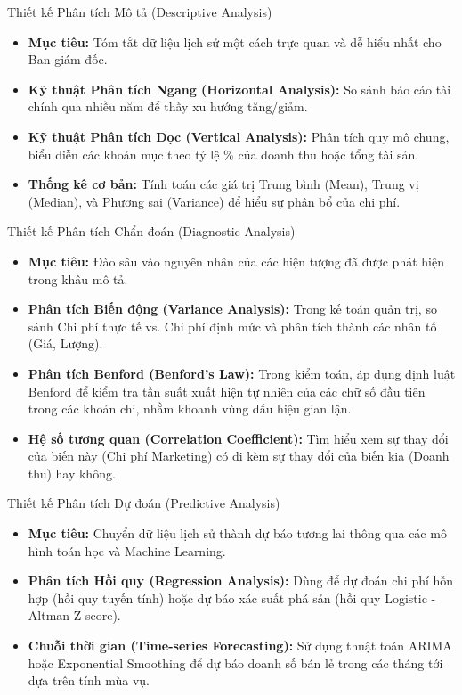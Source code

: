 \documentclass[aspectratio=169,12pt]{beamer}
\begin{document}
\begin{frame}{Thiết kế Phân tích Mô tả (Descriptive Analysis)}
\begin{itemize}
    \item \textbf{Mục tiêu:} Tóm tắt dữ liệu lịch sử một cách trực quan và dễ hiểu nhất cho Ban giám đốc.
    \item \textbf{Kỹ thuật Phân tích Ngang (Horizontal Analysis):} So sánh báo cáo tài chính qua nhiều năm để thấy xu hướng tăng/giảm.
    \item \textbf{Kỹ thuật Phân tích Dọc (Vertical Analysis):} Phân tích quy mô chung, biểu diễn các khoản mục theo tỷ lệ \% của doanh thu hoặc tổng tài sản.
    \item \textbf{Thống kê cơ bản:} Tính toán các giá trị Trung bình (Mean), Trung vị (Median), và Phương sai (Variance) để hiểu sự phân bổ của chi phí.
\end{itemize}
\end{frame}

\begin{frame}{Thiết kế Phân tích Chẩn đoán (Diagnostic Analysis)}
\begin{itemize}
    \item \textbf{Mục tiêu:} Đào sâu vào nguyên nhân của các hiện tượng đã được phát hiện trong khâu mô tả.
    \item \textbf{Phân tích Biến động (Variance Analysis):} Trong kế toán quản trị, so sánh Chi phí thực tế vs. Chi phí định mức và phân tích thành các nhân tố (Giá, Lượng).
    \item \textbf{Phân tích Benford (Benford's Law):} Trong kiểm toán, áp dụng định luật Benford để kiểm tra tần suất xuất hiện tự nhiên của các chữ số đầu tiên trong các khoản chi, nhằm khoanh vùng dấu hiệu gian lận.
    \item \textbf{Hệ số tương quan (Correlation Coefficient):} Tìm hiểu xem sự thay đổi của biến này (Chi phí Marketing) có đi kèm sự thay đổi của biến kia (Doanh thu) hay không.
\end{itemize}
\end{frame}

\begin{frame}{Thiết kế Phân tích Dự đoán (Predictive Analysis)}
\begin{itemize}
    \item \textbf{Mục tiêu:} Chuyển dữ liệu lịch sử thành dự báo tương lai thông qua các mô hình toán học và Machine Learning.
    \item \textbf{Phân tích Hồi quy (Regression Analysis):} Dùng để dự đoán chi phí hỗn hợp (hồi quy tuyến tính) hoặc dự báo xác suất phá sản (hồi quy Logistic - Altman Z-score).
    \item \textbf{Chuỗi thời gian (Time-series Forecasting):} Sử dụng thuật toán ARIMA hoặc Exponential Smoothing để dự báo doanh số bán lẻ trong các tháng tới dựa trên tính mùa vụ.
\end{itemize}
\end{frame}
\end{document}

